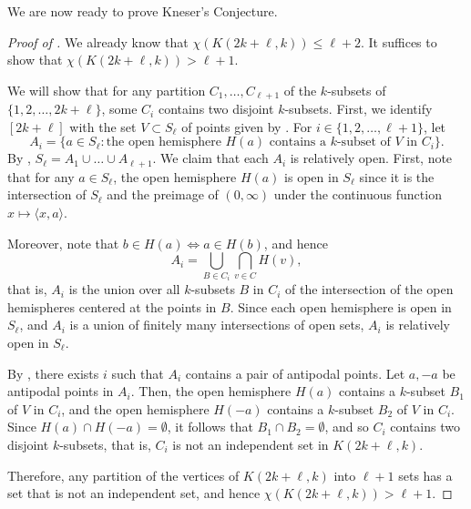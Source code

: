 We are now ready to prove Kneser's Conjecture.

\begin{proof}[Proof of ]
    We already know that \(\chi(K(2k+\ell, k)) \leq \ell + 2\).
    It suffices to show that \(\chi(K(2k+\ell, k)) > \ell + 1\).

    We will show that for any partition 
    \(C_1, \dots, C_{\ell+1}\)
    of the \(k\)-subsets of \(\{1, 2, \ldots, 2k+\ell\}\),
    some \(C_i\) contains two disjoint \(k\)-subsets.
    First, we identify \([2k+\ell]\) with the set \(V \subset S_\ell\) of points
    given by .
    For \(i \in \{1, 2, \ldots, \ell+1\}\), let
    \begin{equation}
        A_i = \{
            a \in S_\ell :
            \text{the open hemisphere \(H(a)\) contains a \(k\)-subset of \(V\) in \(C_i\)}
        \}.
    \end{equation}
    By ,
    \(S_\ell = A_1 \cup \dots \cup A_{\ell+1}\).
    We claim that each \(A_i\) is relatively open.
    First, note that for any \(a \in S_\ell\),
    the open hemisphere \(H(a)\) is open in \(S_\ell\)
    since it is the intersection of \(S_\ell\) and
    the preimage of \((0, \infty)\)
    under the continuous function \(x \mapsto \langle x, a \rangle\).

    Moreover, note that \(b \in H(a) \iff a \in H(b)\), and hence
    \begin{equation}
        A_i = \bigcup_{B \in C_i} \bigcap_{v \in C} H(v),
    \end{equation}
    that is, \(A_i\) is the union over all \(k\)-subsets \(B\) in \(C_i\) of the intersection of the open hemispheres centered at the points in \(B\).
    Since each open hemisphere is open in \(S_\ell\), and \(A_i\) is a union of finitely many intersections of open sets, \(A_i\) is relatively open in \(S_\ell\).

    By ,
    there exists \(i\) such that \(A_i\) contains a pair of antipodal points.
    Let \(a, -a\) be antipodal points in \(A_i\).
    Then, the open hemisphere \(H(a)\) contains a \(k\)-subset \(B_1\) of \(V\) in \(C_i\),
    and the open hemisphere \(H(-a)\) contains a \(k\)-subset \(B_2\) of \(V\) in \(C_i\).
    Since \(H(a) \cap H(-a) = \emptyset\),
    it follows that \(B_1 \cap B_2 = \emptyset\),
    and so \(C_i\) contains two disjoint \(k\)-subsets,
    that is, \(C_i\) is not an independent set in \(K(2k+\ell, k)\).

    Therefore,
    any partition of the vertices of \(K(2k+\ell, k)\) into \(\ell+1\) sets 
    has a set that is not an independent set,
    and hence \(\chi(K(2k+\ell, k)) > \ell + 1\).
\end{proof}

